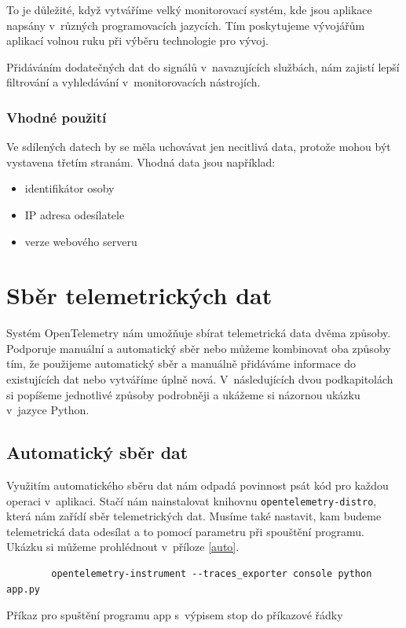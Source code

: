 To je důležité, když vytváříme velký monitorovací systém, kde jsou aplikace napsány v~různých programovacích jazycích. Tím poskytujeme vývojářům aplikací volnou ruku při výběru technologie pro vývoj.

Přidáváním dodatečných dat do signálů v~navazujících službách, nám zajistí lepší filtrování a vyhledávání v~monitorovacích nástrojích.

\subsubsection{Vhodné použití}

Ve sdílených datech by se měla uchovávat jen necitlivá data, protože mohou být vystavena třetím stranám. Vhodná data jsou například:
\begin{itemize}
        \item{identifikátor osoby}
        \item{IP adresa odesílatele}
        \item{verze webového serveru}
\end{itemize}


\section{Sběr telemetrických dat}

Systém OpenTelemetry nám umožňuje sbírat telemetrická data dvěma způsoby. Podporuje manuální a automatický sběr nebo můžeme kombinovat oba způsoby tím, že použijeme automatický sběr a manuálně přidáváme informace do existujících dat nebo vytváříme úplně nová. V~následujících dvou podkapitolách si popíšeme jednotlivé způsoby podrobněji a ukážeme si názornou ukázku v~jazyce Python.

\subsection{Automatický sběr dat}
Využitím automatického sběru dat nám odpadá povinnost psát kód pro každou operaci v~aplikaci. Stačí nám nainstalovat knihovnu \texttt{opentelemetry-distro}, která nám zařídí sběr telemetrických dat. Musíme také nastavit, kam budeme telemetrická data odesílat a to pomocí parametru při spouštění programu. Ukázku si můžeme prohlédnout v~příloze \ref{auto}.
\begin{listing}[H]
    \begin{verbatim}
        opentelemetry-instrument --traces_exporter console python app.py
    \end{verbatim}
    \caption{Příkaz pro spuštění programu app s~výpisem stop do příkazové řádky}
    \label{lst:bash1}
\end{listing}


